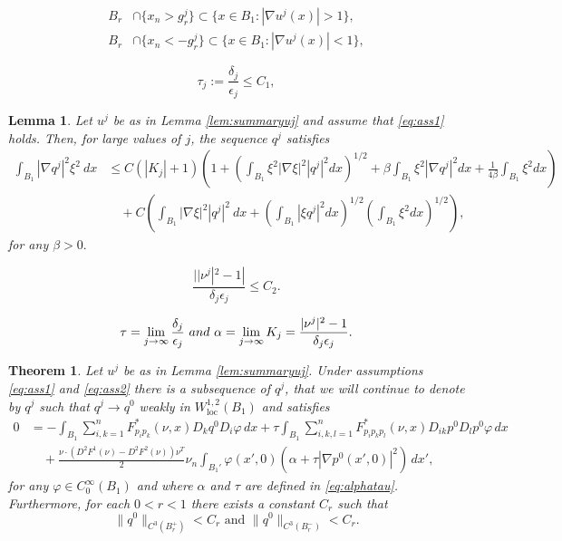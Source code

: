\documentclass[10pt,a4paper]{amsart}
\newtheorem{lem}{Lemma}
\newtheorem{thm}{Theorem}
\newcommand{\loc}{\mathrm{loc}}
\begin{document}
\begin{align}
    B_r& \cap \{x_n>g^j_r \} \subset \{ x \in B_1: |\nabla u^j(x)|>1 \}, \\
    B_r& \cap \{x_n < -g^j_r \} \subset \{ x \in B_1: |\nabla u^j(x)|<1 \}, 
\end{align}

\begin{equation}\label{eq:ass1}
    \tau_j:= \frac{\delta_j}{\epsilon_j}\leq C_1,
\end{equation}

\begin{lem}
\label{lem:weak_convergence}
Let $u^j$ be as in Lemma \ref{lem:summaryuj} and assume that \eqref{eq:ass1} holds. Then, for large values of $j$, the sequence $q^j$ satisfies
\begin{align} \label{eq:qjBound}
 \int_{B_1} |\nabla q^j|^2 \xi^2 \ dx  & \leq C(|K_j|+1) \left(1 + \left(\int_{B_1} \xi^2 |\nabla \xi|^2 |q^j|^2 dx \right)^{1/2}+\beta \int_{B_1} \xi^2 |\nabla q^j|^2 dx + \frac{1}{4 \beta} \int_{B_1} \xi^2 dx \right)  \\
 &\quad + C \left(\int_{B_1} |\nabla \xi|^2 |q^j|^2 \ dx + \left(\int_{B_1} |\xi q^j|^2 dx \right)^{1/2} \left( \int_{B_1} \xi^2 dx \right)^{1/2} \right), \nonumber
\end{align}
for any $\beta >0.$
\end{lem}

\begin{equation}\label{eq:ass2}
    \frac{||\nu^j|^2-1| }{\delta_j \epsilon_j} \leq C_2.
\end{equation}

\begin{equation}\label{eq:alphatau}
    \tau = \lim_{j \to \infty} \frac{\delta_j}{\epsilon_j} \ \textup{ and } \ \alpha=\lim_{j\to \infty}  K_j= \frac{|\nu^j|^2-1}{\delta_j \epsilon_j}.
\end{equation}

\begin{thm}
\label{thm:mainthm}
 Let $u^j$ be as in Lemma \ref{lem:summaryuj}. Under assumptions \eqref{eq:ass1} and \eqref{eq:ass2} there is a subsequence of $q^j$, that we will continue to denote by $q^j$ such that $q^j\to q^0$ weakly in $ W_{\loc}^{1,2}(B_1)$ and satisfies
\begin{align}
\label{eq:q0equation}
     0 &= - \int_{B_1}  \sum_{i, k = 1}^n  F^*_{p_ip_k}(\nu,x) D_k q^0 D_i \varphi \, dx +  \tau \int_{B_1} \sum_{i, k, l = 1}^n   F^*_{p_ip_k p_l}(\nu,x) D_{ik} p^0 D_l p^0 \varphi \, dx \nonumber \\
      & \quad +  \frac{\nu \cdot (D^2 F^1 (\nu)-D^2 F^2(\nu)) \nu^T}{2} \nu_n \int_{B_1'}  \varphi(x',0) \left(\alpha + \tau |\nabla p^0(x',0)|^2\right) \, dx',
\end{align}
for any $\varphi \in C^{\infty}_0(B_1)$ and where $\alpha$ and $\tau$ are defined in \eqref{eq:alphatau}. Furthermore, for each $0<r<1$ there exists a constant $C_r$ such that
\begin{equation}\label{eq:C3est}
\|q^{0}\|_{C^{3}(B_r^{+})} < C_r \textrm{ and }\|q^{0}\|_{C^{3}(B_r^{-})} < C_r.
\end{equation}
\end{thm}
\end{document}
